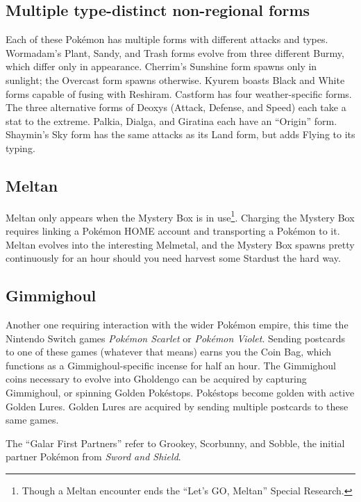 \subsection{Multiple type-distinct non-regional forms}
Each of these Pokémon has multiple forms with different attacks and types.
Wormadam's Plant, Sandy, and Trash forms evolve from three different Burmy,
 which differ only in appearance.
Cherrim's Sunshine form spawns only in sunlight; the Overcast form spawns otherwise.
Kyurem boasts Black and White forms capable of fusing with Reshiram.
Castform has four weather-specific forms.
The three alternative forms of Deoxys (Attack, Defense, and Speed) each take a stat to the extreme.
Palkia, Dialga, and Giratina each have an ``Origin'' form.
Shaymin's Sky form has the same attacks as its Land form, but adds Flying to its typing.

\subsection{Meltan\label{subsec:meltan}}
Meltan only appears when the Mystery Box is in use\footnote{Though a Meltan encounter ends the ``Let's GO, Meltan'' Special Research.}.
Charging the Mystery Box requires linking a Pokémon HOME account and transporting
  a Pokémon to it.
Meltan evolves into the interesting Melmetal, and the Mystery
  Box spawns pretty continuously for an hour should you need harvest some Stardust
  the hard way.

\subsection{Gimmighoul\label{sec:gimmighoul}}
Another one requiring interaction with the wider Pokémon empire, this time
 the Nintendo Switch games \textit{Pokémon Scarlet} or \textit{Pokémon Violet}.
Sending postcards to one of these games (whatever that means) earns you the Coin Bag,
 which functions as a Gimmighoul-specific incense for half an hour.
The Gimmighoul coins necessary to evolve into Gholdengo can be acquired by capturing
 Gimmighoul, or spinning Golden Pokéstops.
Pokéstops become golden with active Golden Lures.
Golden Lures are acquired by sending multiple postcards to these same games.

\begin{tipbox}[title=Galar First Partners]
The ``Galar First Partners'' refer to Grookey, Scorbunny, and Sobble, the
initial partner Pokémon from \textit{Sword and Shield}.
\end{tipbox}
